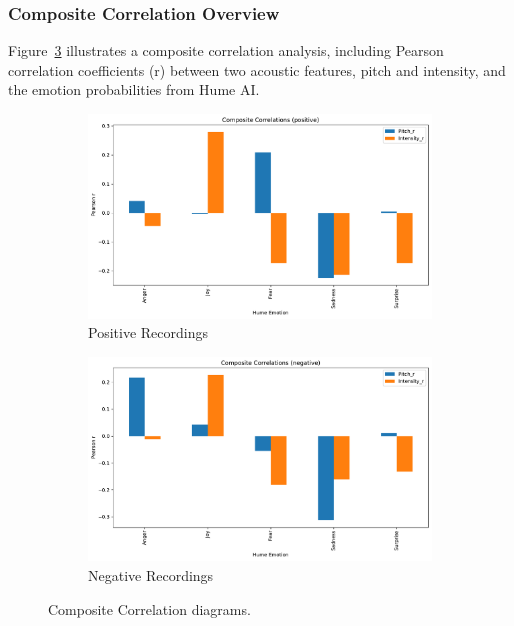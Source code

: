 \subsubsection{Composite Correlation Overview}
Figure~\ref{fig:rq1_composite} illustrates a composite correlation analysis, including Pearson correlation coefficients (r) between two acoustic features, pitch and intensity, and the emotion probabilities from Hume AI. 

\begin{figure}[H]
    \centering 
    \begin{subfigure}[b]{0.48\textwidth}
        \centering
    \includegraphics[width=\textwidth]{png/results/rq1_new/composite_correlations_positive.pdf}
    \caption{Positive Recordings}
    \label{fig:rq1_composite_pos}
    \end{subfigure}
    \hfill 
    \begin{subfigure}[b]{0.48\textwidth}
        \centering
        \includegraphics[width=\textwidth]{png/results/rq1_new/composite_correlations_negative.pdf}
    \caption{Negative Recordings}
    \label{fig:rq1_composite_neg}
    \end{subfigure}
    \caption{Composite Correlation diagrams.}
    \label{fig:rq1_composite}
\end{figure}

